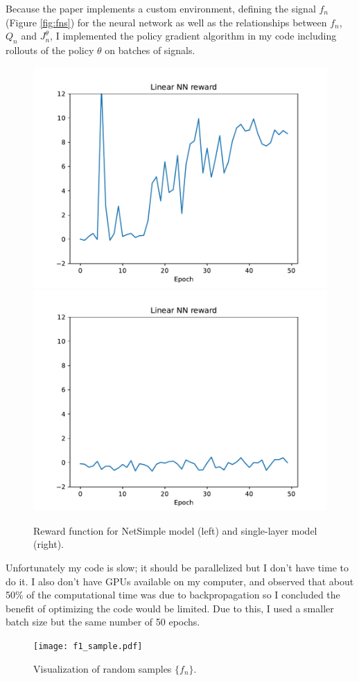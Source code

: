 \documentclass{article}
\begin{document}
	\par Because the paper implements a custom environment, defining the signal $f_n$ (Figure \ref{fig:fns}) for the neural network as well as the relationships between $f_n$, $Q_n$ and $J_n^\theta$, I implemented the policy gradient algorithm in my code including rollouts of the policy $\theta$ on batches of signals.
	\vspace{4em}

	\begin{figure}[t]
		\centering
		\includegraphics[width=0.49\linewidth]{figures/linear_training_reward.pdf}
		\includegraphics[width=0.49\linewidth]{figures/singlelayer.pdf}
		\caption{Reward function for NetSimple model (left) and single-layer model (right).}
		\label{fig:networks}
	\end{figure}
	
	
	Unfortunately my code is slow; it should be parallelized but I don't have time to do it. I also don't have GPUs available on my computer, and observed that about 50\% of the computational time was due to backpropagation so I concluded the benefit of optimizing the code would be limited.
	Due to this, I used a smaller batch size but the same number of 50 epochs.
	
	\begin{figure}[h]
		\centering
		\texttt{[image: f1\_sample.pdf]}
		\caption{Visualization of random samples $\{f_n\}.$}
	\end{figure}
	
\end{document}
